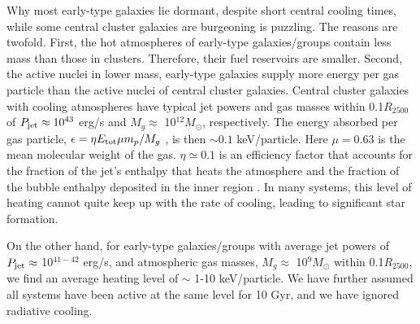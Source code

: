\documentclass[apjl]{emulateapj}
\begin{document}
Why most early-type galaxies lie dormant, despite short central cooling times, while some central cluster galaxies are burgeoning is puzzling.  The reasons are twofold.  First, the hot atmospheres of early-type galaxies/groups contain less mass than those in clusters.  Therefore, their fuel reservoirs are smaller.  Second, the active nuclei in lower mass, early-type galaxies supply more  energy per gas particle than the active nuclei of central cluster galaxies. Central cluster galaxies with cooling atmospheres have typical jet powers and gas masses within 0.1$R_{2500}$ of $P_{\rm jet} \approx 10^{43}$ erg/s and $M_g \approx$ 10$^{12} M_{\odot}$, respectively. The energy absorbed per gas particle, $\epsilon = \eta E_{\rm tot} \mu m_p / M_{g}$ \citep{Ma:11}, is then $\sim0.1$ keV/particle.  Here $\mu=0.63$ is the mean molecular weight of the gas.  $\eta \simeq 0.1$ is an efficiency factor that accounts for the fraction of the jet's enthalpy that heats the atmosphere and the fraction of the bubble enthalpy deposited in the inner region \citep{Weinberger:17}. In many systems, this level of heating cannot quite keep up with the rate of cooling, leading to significant star formation.  
 
On the other hand, for early-type galaxies/groups with average jet powers of $P_{\rm jet} \approx$ 10$^{41-42}$ erg/s, and atmospheric gas masses, $M_{g} \approx$ 10$^{9} M_{\odot}$  within 0.1$R_{2500}$, we find an average heating level of $\sim$ 1-10 keV/particle. We have further assumed all systems have been active at the same level for 10 Gyr, and we have ignored radiative cooling. 
\end{document}
